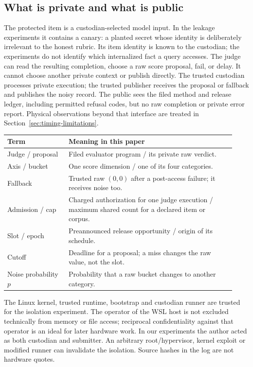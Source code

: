 \documentclass[10pt,twocolumn]{article}
\begin{document}
\subsection{What is private and what is public}
The protected item is a custodian-selected model input. In the leakage experiments it contains a canary: a planted secret whose identity is deliberately irrelevant to the honest rubric. Its item identity is known to the custodian; the experiments do not identify which internalized fact a query accesses. The judge can read the resulting completion, choose a raw score proposal, fail, or delay. It cannot choose another private context or publish directly. The trusted custodian processes private execution; the trusted publisher receives the proposal or fallback and publishes the noisy record. The public sees the filed method and release ledger, including permitted refusal codes, but no raw completion or private error report. Physical observations beyond that interface are treated in Section~\ref{sec:timing-limitations}.

\begin{center}\small
\begin{tabular}{@{}>{\raggedright\arraybackslash}p{0.25\linewidth}>{\raggedright\arraybackslash}p{0.68\linewidth}@{}}\toprule
Term & Meaning in this paper\\\midrule
Judge / proposal & Filed evaluator program / its private raw verdict.\\
Axis / bucket & One score dimension / one of its four categories.\\
Fallback & Trusted raw $(0,0)$ after a post-access failure; it receives noise too.\\
Admission / cap & Charged authorization for one judge execution / maximum shared count for a declared item or corpus.\\
Slot / epoch & Preannounced release opportunity / origin of its schedule.\\
Cutoff & Deadline for a proposal; a miss changes the raw value, not the slot.\\
Noise probability $p$ & Probability that a raw bucket changes to another category.\\
\bottomrule\end{tabular}
\end{center}


The Linux kernel, trusted runtime, bootstrap and custodian runner are trusted for the isolation experiment. The operator of the WSL host is not excluded technically from memory or file access; reciprocal confidentiality against that operator is an ideal for later hardware work. In our experiments the author acted as both custodian and submitter. An arbitrary root/hypervisor, kernel exploit or modified runner can invalidate the isolation. Source hashes in the log are not hardware quotes.
\end{document}
